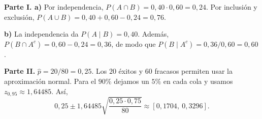 \textbf{Parte I. a)} Por independencia, $P(A\cap B)=0{,}40\cdot0{,}60=\boxed{0{,}24}$. Por inclusión y exclusión, $P(A\cup B)=0{,}40+0{,}60-0{,}24=\boxed{0{,}76}$.

\textbf{b)} La independencia da $P(A\mid B)=\boxed{0{,}40}$. Además, $P(B\cap A^c)=0{,}60-0{,}24=0{,}36$, de modo que $P(B\mid A^c)=0{,}36/0{,}60=\boxed{0{,}60}$.

\textbf{Parte II.} $\hat p=20/80=0{,}25$. Los $20$ éxitos y $60$ fracasos permiten usar la aproximación normal. Para el $90\%$ dejamos un $5\%$ en cada cola y usamos $z_{0{,}95}\approx1{,}64485$. Así,
\[
0{,}25\pm1{,}64485\sqrt{\frac{0{,}25\cdot0{,}75}{80}}
\approx\boxed{[0{,}1704,\ 0{,}3296]}.
\]
